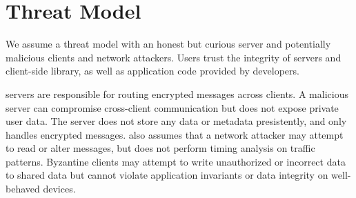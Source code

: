 \section{Threat Model}


We assume a threat model with an honest but curious server and 
potentially malicious clients and network attackers. 
Users trust the integrity of \name{} servers and client-side library,
as well as application code provided by developers. 

\name{} servers are responsible for routing encrypted messages across
clients. A malicious server can compromise cross-client communication 
but does not expose private user data. The server does 
not store any data or metadata presistently, and only handles encrypted
messages. \name{} also assumes that a network attacker may attempt
to read or alter messages, but does not perform timing analysis on 
traffic patterns.
Byzantine clients may attempt to write unauthorized or incorrect data 
to shared data but cannot violate application invariants or data 
integrity on well-behaved devices. 

